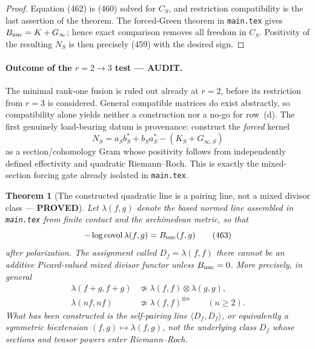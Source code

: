\documentclass[11pt]{article}
\newtheorem{theorem}{Theorem}
\newcommand{\PROVED}{\textcolor{green!45!black}{\textbf{PROVED}}}
\newcommand{\AUDIT}{\textcolor{orange!75!black}{\textbf{AUDIT}}}
\begin{document}
\begin{proof}
Equation (462) is (460) solved for \(C_S\), and restriction compatibility
is the last assertion of the theorem.  The forced-Green theorem in
\texttt{main.tex} gives
\(B_{\rm nuc}=K+G_\infty\); hence exact comparison removes all freedom in
\(C_S\).  Positivity of the resulting \(N_S\) is then precisely (459) with
the desired sign.
\end{proof}

\paragraph{Outcome of the \(r=2\to3\) test --- \AUDIT.}
The minimal rank-one fusion is ruled out already at \(r=2\), before its
restriction from \(r=3\) is considered.  General compatible matrices do
exist abstractly, so compatibility alone yields neither a construction nor
a no-go for row~(d).  The first genuinely load-bearing datum is provenance:
construct the \emph{forced} kernel
\[
 N_S=a_Sb_S^*+b_Sa_S^*
     -(K_S+G_{\infty,S})
\]
as a section/cohomology Gram whose positivity follows from independently
defined effectivity and quadratic Riemann--Roch.  This is exactly the
mixed-section forcing gate already isolated in \texttt{main.tex}.

\begin{theorem}[The constructed quadratic line is a pairing line, not a
mixed divisor class --- \PROVED]
Let \(\lambda(f,g)\) denote the based normed line assembled in
\texttt{main.tex} from finite contact and the archimedean metric, so that
\begin{equation}
 -\log\operatorname{covol}\lambda(f,g)=B_{\rm nuc}(f,g) \tag{463}
\end{equation}
after polarization.  The assignment called \(D_f=\lambda(f,f)\) there
cannot be an additive Picard-valued mixed divisor functor unless
\(B_{\rm nuc}=0\).  More precisely, in general
\begin{align}
 \lambda(f+g,f+g)
 &\not\simeq
 \lambda(f,f)\otimes\lambda(g,g),                    \tag{464}\\
 \lambda(nf,nf)
 &\not\simeq \lambda(f,f)^{\otimes n}\qquad(n\ge2).  \tag{465}
\end{align}
What has been constructed is the self-pairing line
\(\langle D_f,D_f\rangle\), or equivalently a symmetric biextension
\((f,g)\mapsto\lambda(f,g)\), not the underlying class \(D_f\) whose
sections and tensor powers enter Riemann--Roch.
\end{theorem}
\end{document}
